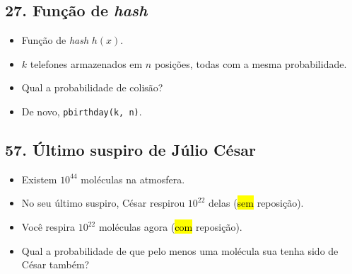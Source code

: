 \documentclass[
  11pt]{report}
\providecommand{\tightlist}{%
  \setlength{\itemsep}{0pt}\setlength{\parskip}{0pt}}
\begin{document}
\hypertarget{funuxe7uxe3o-de-hash}{%
\subsection*{\texorpdfstring{27. Função de \emph{hash}}{27. Função de hash}}\label{funuxe7uxe3o-de-hash}}

\begin{rmdbox}

\begin{itemize}
\item
  Função de \emph{hash} $h(x)$.
\item
  $k$ telefones armazenados em $n$ posições, todas com a mesma probabilidade.
\item
  Qual a probabilidade de colisão?
\end{itemize}

\end{rmdbox}

\begin{itemize}
\tightlist
\item
  De novo, \texttt{pbirthday(k,\ n)}.
\end{itemize}

\hypertarget{uxfaltimo-suspiro-de-juxfalio-cuxe9sar}{%
\subsection*{57. Último suspiro de Júlio César}\label{uxfaltimo-suspiro-de-juxfalio-cuxe9sar}}

\begin{rmdbox}

\begin{itemize}
\item
  Existem $10^{44}$ moléculas na atmosfera.
\item
  No seu último suspiro, César respirou $10^{22}$ delas ({\hl{sem}} reposição).
\item
  Você respira $10^{22}$ moléculas agora ({\hl{com}} reposição).
\item
  Qual a probabilidade de que pelo menos uma molécula sua tenha sido de César também?
\end{itemize}

\end{rmdbox}
\end{document}
